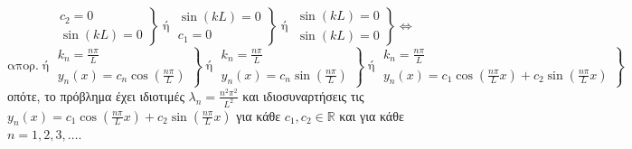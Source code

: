 \begin{solution}
\begin{myitemize}
\[        \left.
          \begin{matrix}
            c_{2} = 0 \\
            \sin{(kL)} = 0 
          \end{matrix} 
        \right\} \; \text{ή} \; 
        \left.
          \begin{matrix}
            \sin{(kL)} = 0 \\
            c_{1} = 0 
          \end{matrix} 
        \right\} \; \text{ή} \; 
        \left.
          \begin{matrix}
            \sin{(kL)} = 0 \\
            \sin{(kL)} = 0 
          \end{matrix} 
        \right\} \Leftrightarrow 
      \]
      \[
        \text{απορ.} \; \text{ή} \; 
        \left.
          \begin{matrix}
            k_{n} = \frac{n \pi}{L} \\
            y_{n}(x) = c_{n} \cos{\left(\frac{n \pi}{L}\right)} 
          \end{matrix} 
        \right\} \; \text{ή} \; 
        \left.
          \begin{matrix}
            k_{n} = \frac{n \pi}{L} \\
            y_{n}(x) = c_{n} \sin{\left(\frac{n \pi}{L}\right)} 
          \end{matrix} 
        \right\} \; \text{ή} \;
        \left.
          \begin{matrix}
            k_{n} = \frac{n \pi}{L} \\
            y_{n}(x) = c_{1} \cos{\left(\frac{n \pi}{L} x\right)} + c_{2} 
            \sin{\left(\frac{n \pi}{L} x\right)} 
          \end{matrix}
        \right\} 
      \]
      οπότε, το πρόβλημα έχει ιδιοτιμές $ \lambda _{n} = \frac{n^{2} \pi ^{2}}{L^{2}} $
      και ιδιοσυναρτήσεις τις 
      $ y_{n}(x) = c_{1} \cos{\left(\frac{n \pi}{L} x\right)} + c_{2} 
      \sin{\left(\frac{n \pi}{L} x\right)} $ για κάθε $ c_{1}, c_{2} \in \mathbb{R} $ 
      και για κάθε $ n = 1,2,3,\ldots$.
  \end{myitemize}
\end{solution}









